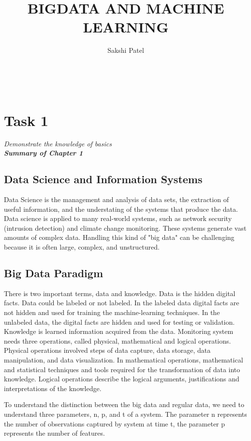 \documentclass[conference,12pt]{IEEEtran}
\begin{document}
\title{BIGDATA AND MACHINE LEARNING}
\author{Sakshi Patel }\\


\section{Task 1}
\textit{Demonstrate the knowledge of basics}\\
\textit{\textbf{Summary of Chapter 1}}

\subsection{Data Science and Information Systems}
Data Science is the management and analysis of data sets, the extraction of useful information, and the understating of the systems that produce the data. Data science is applied to many real-world systems, such as network security (intrusion detection) and climate change monitoring. These systems generate vast amounts of complex data. Handling this kind of "big data" can be challenging because it is often large, complex, and unstructured.

\subsection{Big Data Paradigm}
There is two important terms, data and knowledge. Data is the hidden digital facts. Data could be labeled or not labeled. In the labeled data digital facts are not hidden and used for training the machine-learning techniques. In the unlabeled data, the digital facts are hidden and used for testing or validation. Knowledge is learned information acquired from the data. Monitoring system needs three operations, called physical, mathematical and logical operations. Physical operations involved steps of data capture, data storage, data manipulation, and data visualization. In mathematical operations, mathematical and statistical techniques and tools required for the transformation of data into knowledge. Logical operations describe the logical arguments, justifications and interpretations of the knowledge.

To understand the distinction between the big data and regular data, we need to understand three parameters, n, p, and t of a system. The parameter n represents the number of observations captured by system at time t, the parameter p represents the number of features.
\end{document}
